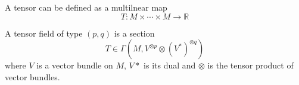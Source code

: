 \documentclass{book}
\begin{document}
		A tensor can be defined as a multilnear map
		\begin{equation}
			T:M\times\cdots\times M\rightarrow\mathbb{R}
		\end{equation}
		
		A tensor field of type $(p,q)$ is a section
		\begin{equation}
			T\in\Gamma(M,V^{\otimes p}\otimes(V^*)^{\otimes q})
		\end{equation}
		where $V$ is a vector bundle on $M$, $V*$ is its dual and $\otimes$ is the tensor product of vector bundles.
\end{document}
